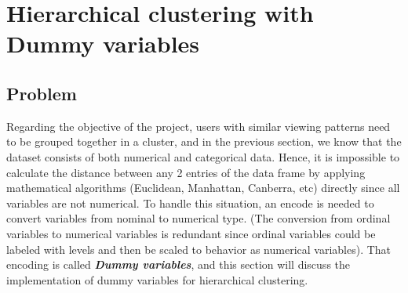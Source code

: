 \section{Hierarchical clustering with Dummy variables}




\subsection{Problem}
    Regarding the objective of the project, users with similar viewing patterns need to be grouped together in a cluster, and in the previous section, we know that the dataset consists of both numerical and categorical data. Hence, it is impossible to calculate the distance between any 2 entries of the data frame by applying mathematical algorithms (Euclidean, Manhattan, Canberra, etc) directly since all variables are not numerical. To handle this situation, an encode is needed to convert variables from nominal to numerical type. (The conversion from ordinal variables to numerical variables is redundant since ordinal variables could be labeled with levels and then be scaled to behavior as numerical variables). That encoding is called \textbf{\textit{Dummy variables}}, and this section will discuss the implementation of dummy variables for hierarchical clustering.

